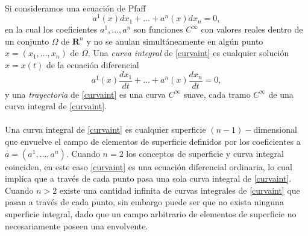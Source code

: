 \documentclass{article}
\theoremstyle{definition} \newtheorem{defi}{Definici\'on}
\theoremstyle{definition} \newtheorem{teo}{Teorema}
\theoremstyle{definition} \newtheorem{cor}{Corolario}
\begin{document}
\paragraph{}
Si consideramos una ecuaci\'on de Pfaff
\begin{equation}\label{curvaint}
a^1(x)dx_1 + \dots + a^n(x)dx_n = 0,
\end{equation}
en la cual los coeficientes $a^1, \dots, a^n$ son funciones $C^\infty$ con valores reales dentro de un conjunto $\Omega$ de $\mathbf{R}^n$ y no se anulan simult\'aneamente en alg\'un punto $x=(x_1,\dots,x_n)$ de $\Omega$. Una \emph{curva integral} de \eqref{curvaint} es cualquier soluci\'on $x=x(t)$ de la ecuaci\'on diferencial
$$a^1(x)\frac{dx_1}{dt} + \dots + a^n(x)\frac{dx_n}{dt} = 0,$$
y una \emph{trayectoria} de \eqref{curvaint} es una curva $C^\infty$ suave, cada tramo $C^\infty$ de una curva integral de \eqref{curvaint}.
\paragraph{}
Una curva integral de \eqref{curvaint} es cualquier superficie $(n-1)-$dimensional que envuelve el campo de elementos de superficie definidos por los coeficientes a $a=(a^1, \dots, a^n).$ Cuando $n=2$ los conceptos de superficie y curva integral coinciden, en este caso \eqref{curvaint} es una ecuaci\'on diferencial ordinaria, lo cual implica que a trav\'es de cada punto pasa una sola curva integral de \eqref{curvaint}. Cuando $n>2$ existe una cantidad infinita de curvas integrales de \eqref{curvaint} que pasan a trav\'es de cada punto, sin embargo puede ser que no exista ninguna superficie integral, dado que un campo arbitrario de elementos de superficie no necesariamente poseen una envolvente.
\end{document}

